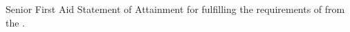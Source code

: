 \begin{qualifications}

{Senior First Aid}
{Statement of Attainment for fulfilling the requirements of
 from the
.}

\end{qualifications}
